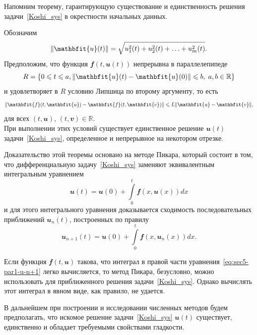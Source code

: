\documentclass[11pt,a4paper,twoside]{report}
\numberwithin{equation}{section}
\theoremstyle{definition}
\theoremstyle{plain}
\DeclarePairedDelimiter\norm{\lVert}{\rVert}
\newcommand{\vfunc}[1]{\mathbfit{#1}}
\begin{document}
Напомним теорему, гарантирующую существование и единственность решения
задачи~\eqref{Koshi_sys} в окрестности начальных данных.

Обозначим
%
$$
    \norm{\vfunc{u}(t)} = \sqrt{u_1^2(t) + u_2^2(t) + \ldots + u_m^2(t)}.
$$
%
Предположим, что функция $\vfunc{f}(t, \vfunc{u}(t))$ непрерывна в параллелепипеде
%
$$
    R = \{0 \leqslant t \leqslant a, \norm{\vfunc{u}(t)-\vfunc{u}(0)}\leqslant b,\;
    a, b\in\mathbb{R}\}
$$
%
и удовлетворяет в $R$ условию Липшица по второму аргументу, то есть
%
$$
    \norm{\vfunc{f}(t, \vfunc{u}) - \vfunc{f}(t, \vfunc{v})} \leqslant
    L\norm{\vfunc{u} - \vfunc{v}},
$$
%
для всех $(t, \vfunc{u})$, $(t, \vfunc{v}) \in \mathbb{R}$.\\
При выполнении этих условий существует единственное решение $\vfunc{u}(t)$
задачи~\eqref{Koshi_sys}, определенное и непрерывное на некотором отрезке.

Доказательство этой теоремы основано на методе Пикара, который состоит в том,
что дифференциальную задачу~\eqref{Koshi_sys} заменяют эквивалентным интегральным
уравнением
%
$$
    \vfunc{u}(t) = \vfunc{u}(0) + \int \limits_0^t \vfunc{f}(x, \vfunc{u}(x))dx
$$
%
и для этого интегрального уравнения доказывается сходимость последовательных
приближений $\vfunc{u}_n(t)$, построенных по правилу
%
\begin{equation}
    \label{eq:sec5-par1-u-n+1}
    \vfunc{u}_{n+1}(t) = \vfunc{u}(0) + \int\limits_0^t
        \vfunc{f}(x, \vfunc{u}_n(x)) dx.
\end{equation}
%

Если функция $\vfunc{f}(t, \vfunc{u})$ такова, что интеграл в правой части
уравнения~\eqref{eq:sec5-par1-u-n+1} легко вычисляется, то метод Пикара,
безусловно, можно использовать для приближенного решения задачи~\eqref{Koshi_sys}.
Однако вычислять этот интеграл в явном виде, как правило, не удается.

В дальнейшем при построении и исследовании численных методов будем предполагать,
что искомое решение задачи~\eqref{Koshi_sys} $\vfunc{u}(t)$ существует,
единственно и обладает требуемыми свойствами гладкости.
\end{document}
